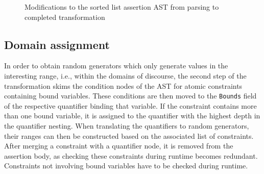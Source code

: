 \begin{figure}[t]
{}
\hfill
{}
\caption{Modifications to the sorted list assertion AST from parsing to completed transformation}
\end{figure}

\subsection{Domain assignment}\label{sec:transf_domains}
In order to obtain random generators which only generate values in the interesting range, i.e., within the domains of discourse, the second step of the transformation skims the condition nodes of the AST for atomic constraints containing bound variables. These conditions are then moved to the \texttt{Bounds} field of the respective quantifier binding that variable. If the constraint contains more than one bound variable, it is assigned to the quantifier with the highest depth in the quantifier nesting. When translating the quantifiers to random generators, their ranges can then be constructed based on the associated list of constraints. After merging a constraint with a quantifier node, it is removed from the assertion body, as checking these constraints during runtime becomes redundant. Constraints not involving bound variables have to be checked during runtime. 

